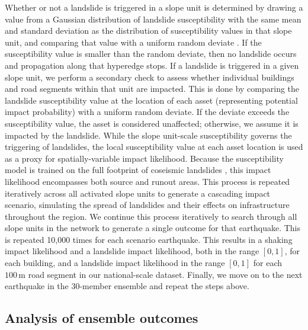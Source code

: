 \documentclass[preprint,12pt,authoryear]{elsarticle}
\begin{document}
Whether or not a landslide is triggered in a slope unit is determined by drawing a value from a Gaussian distribution of landslide susceptibility with the same mean and standard deviation as the distribution of susceptibility values in that slope unit, and comparing that value with a uniform random deviate \citep{Dunant2025}. If the susceptibility value is smaller than the random deviate, then no landslide occurs and propagation along that hyperedge stops. If a landslide is triggered in a given slope unit, we perform a secondary check to assess whether individual buildings and road segments within that unit are impacted. This is done by comparing the landslide susceptibility value at the location of each asset (representing potential impact probability) with a uniform random deviate. If the deviate exceeds the susceptibility value, the asset is considered unaffected; otherwise, we assume it is impacted by the landslide. While the slope unit-scale susceptibility governs the triggering of landslides, the local susceptibility value at each asset location is used as a proxy for spatially-variable impact likelihood. Because the susceptibility model is trained on the full footprint of coseismic landslides \citep{Kincey2021}, this impact likelihood encompasses both source and runout areas. This process is repeated iteratively across all activated slope units to generate a cascading impact scenario, simulating the spread of landslides and their effects on infrastructure throughout the region. We continue this process iteratively to search through all slope units in the network to generate a single outcome for that earthquake. This is repeated 10,000 times for each scenario earthquake. This results in a shaking impact likelihood and a landslide impact likelihood, both in the range $[0,1]$, for each building, and a landslide impact likelihood in the range $[0,1]$ for each $100\,\text{m}$ road segment in our national-scale dataset. Finally, we move on to the next earthquake in the 30-member ensemble and repeat the steps above.

\subsection{Analysis of ensemble outcomes}
\end{document}
